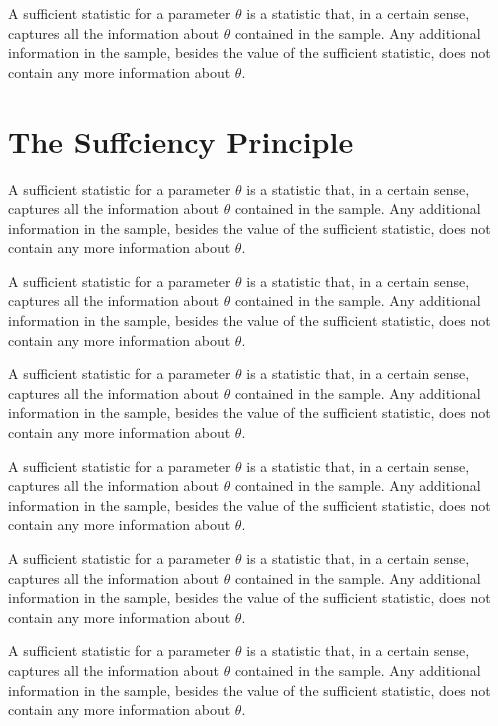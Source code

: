 A sufficient statistic for a parameter $\theta$ is a statistic that, in a certain sense, captures all the information about $\theta$ contained in the sample. Any additional information in the sample, besides the value of the sufficient statistic, does not contain any more information about $\theta$.

\section{The Suffciency Principle}

A sufficient statistic for a parameter $\theta$ is a statistic that, in a certain sense, captures all the information about $\theta$ contained in the sample. Any additional information in the sample, besides the value of the sufficient statistic, does not contain any more information about $\theta$.

A sufficient statistic for a parameter $\theta$ is a statistic that, in a certain sense, captures all the information about $\theta$ contained in the sample. Any additional information in the sample, besides the value of the sufficient statistic, does not contain any more information about $\theta$.

A sufficient statistic for a parameter $\theta$ is a statistic that, in a certain sense, captures all the information about $\theta$ contained in the sample. Any additional information in the sample, besides the value of the sufficient statistic, does not contain any more information about $\theta$.

A sufficient statistic for a parameter $\theta$ is a statistic that, in a certain sense, captures all the information about $\theta$ contained in the sample. Any additional information in the sample, besides the value of the sufficient statistic, does not contain any more information about $\theta$.

A sufficient statistic for a parameter $\theta$ is a statistic that, in a certain sense, captures all the information about $\theta$ contained in the sample. Any additional information in the sample, besides the value of the sufficient statistic, does not contain any more information about $\theta$.

A sufficient statistic for a parameter $\theta$ is a statistic that, in a certain sense, captures all the information about $\theta$ contained in the sample. Any additional information in the sample, besides the value of the sufficient statistic, does not contain any more information about $\theta$.

